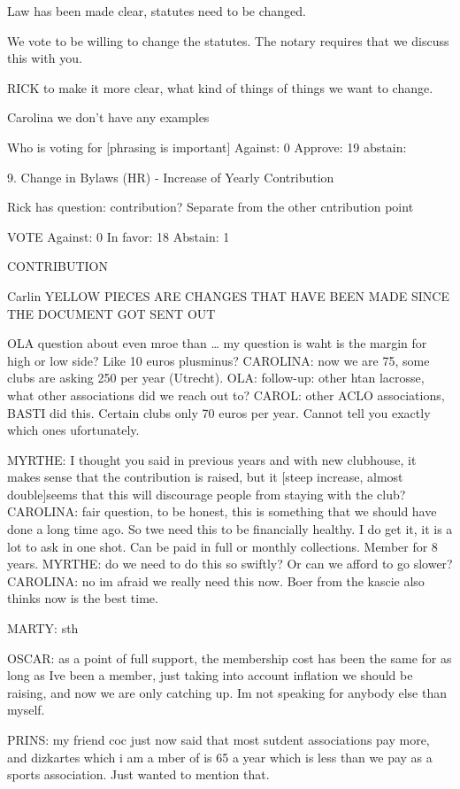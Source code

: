 \documentclass[12pt, a4paper]{article}
\begin{document}
Law has been made clear, statutes need to be changed.

We vote to be willing to change the statutes. The notary requires that we discuss this with you.

RICK to make it more clear, what kind of things of things we want to change.

Carolina we don’t have any examples

Who is voting for [phrasing is important]
Against: 0
Approve: 19
abstain:

9. Change in Bylaws (HR) - Increase of Yearly Contribution

Rick has question: contribution? Separate from the other cntribution point

VOTE
Against: 0
In favor: 18
Abstain: 1


CONTRIBUTION

Carlin YELLOW PIECES ARE CHANGES THAT HAVE BEEN MADE SINCE THE DOCUMENT GOT SENT OUT

OLA question about even mroe than … my question is waht is the margin for high or low side? Like 10 euros plusminus?
CAROLINA: now we are 75, some clubs are asking 250 per year (Utrecht).
OLA: follow-up: other htan lacrosse, what other associations did we reach out to?
CAROL: other ACLO associations, BASTI did this. Certain clubs only 70 euros per year. Cannot tell you exactly which ones ufortunately.

MYRTHE: I thought you said in previous years and with new clubhouse, it makes sense that the contribution is raised, but it [steep increase, almost double]seems that this will discourage people from staying with the club? 
CAROLINA: fair question, to be honest, this is something that we should have done a long time ago. So twe need this to be financially healthy. I do get it, it is a lot to ask in one shot. Can be paid in full or monthly collections. Member for 8 years. 
MYRTHE: do we need to do this so swiftly? Or can we afford to go slower?
CAROLINA: no im afraid we really need this now. Boer from the kascie also thinks now is the best time.

MARTY: sth

OSCAR: as a point of full support, the membership cost has been the same for as long as Ive been a member, just taking into account inflation we should be raising, and now we are only catching up. Im not speaking for anybody else than myself.

PRINS: my friend coc just now said that most sutdent associations pay more, and dizkartes which i am a mber of is 65 a year which is less than we pay as a sports association. Just wanted to mention that.
\end{document}
